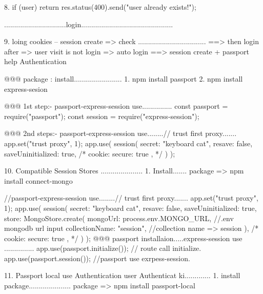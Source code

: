 8. if (user) return res.status(400).send("user already exists!");

...............................login..............................................

9. loing cookies -- session create => check ..................................
   ==> then login after => user visit is not login => auto login 
   ==> session create + passport help Authentication 
   
   @@@ package : install........................
       1. npm install passport
       2. npm install express-sesion 

   @@@ 1st step:- passport-express-session use...............
     const passport = require("passport");
     const session = require("express-session");

   @@@ 2nd steps:- passport-express-session use........// trust first proxy.......
   app.set("trust proxy", 1);
   app.use(
     session({
       secret: "keyboard cat",
       resave: false,
       saveUninitialized: true,
       /* cookie: { secure: true }, */
     })
   );

10. Compatible Session Stores .....................
    1. Install.......
       package => npm install connect-mongo

       //passport-express-session use........// trust first proxy.......
       app.set("trust proxy", 1);
       app.use(
         session({
           secret: "keyboard cat",
           resave: false,
           saveUninitialized: true,
           store: MongoStore.create({
             mongoUrl: process.env.MONGO_URL, //.env mongodb url input
             collectionName: "session", //collection name => session
           }),
           /* cookie: { secure: true }, */
         })
       );
       @@@ passport installaion.....express-session use ...............
       app.use(passport.initialize()); // route call initialize.
       app.use(passport.session()); //passport use exrpess-session.

11. Passport local use  Authentication user Authenticat ki.............
    1. install package.....................
       package => npm install passport-local